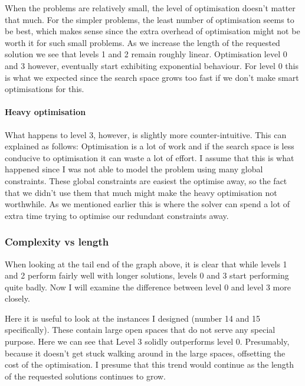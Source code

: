 \documentclass[british]{article}
\begin{document}
	When the problems are relatively small, the level of optimisation doesn't matter that much. For the simpler problems, the least number of optimisation seems to be best, which makes sense since the extra overhead of optimisation might not be worth it for such small problems. As we increase the length of the requested solution we see that levels 1 and 2 remain roughly linear. Optimisation level 0 and 3 however, eventually start exhibiting exponential behaviour. For level 0 this is what we expected since the search space grows too fast if we don't make smart optimisations for this.
	
	\paragraph{Heavy optimisation} What happens to level 3, however, is slightly more counter-intuitive. This can explained as follows: Optimisation is a lot of work and if the search space is less conducive to optimisation it can waste a lot of effort. I assume that this is what happened since I was not able to model the problem using many global constraints. These global constraints are easiest the optimise away, so the fact that we didn't use them that much might make the heavy optimisation not worthwhile. As we mentioned earlier this is where the solver can spend a lot of extra time trying to optimise our redundant constraints away. 
	
	\subsubsection{Complexity vs length} 
	
	When looking at the tail end of the graph above, it is clear that while levels 1 and 2 perform fairly well with longer solutions, levels 0 and 3 start performing quite badly. Now I will examine the difference between level 0 and level 3 more closely. 
	
	Here it is useful to look at the instances I designed (number 14 and 15 specifically). These contain large open spaces that do not serve any special purpose. Here we can see that Level 3 solidly outperforms level 0. Presumably, because it doesn't get stuck walking around in the large spaces, offsetting the cost of the optimisation. I presume that this trend would continue as the length of the requested solutions continues to grow. 
	
\end{document}
